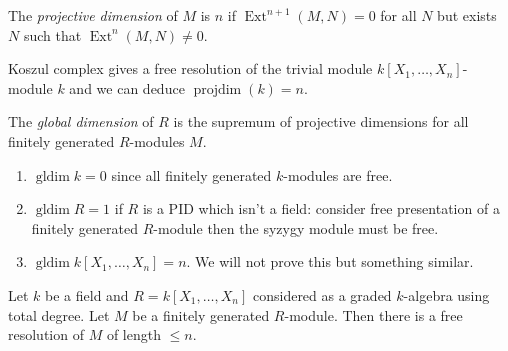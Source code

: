 \documentclass[a4paper]{article}
\DeclareMathOperator{\Ext}{Ext}
\DeclareMathOperator{\projdim}{projdim} %
\DeclareMathOperator{\gldim}{gldim} %
\begin{document}
\begin{definition}
  The \emph{projective dimension} of \(M\) is \(n\)  if \(\Ext^{n + 1}(M, N) = 0\) for all \(N\) but exists \(N\) such that \(\Ext^n(M, N) \ne 0\).
\end{definition}

\begin{eg}
  Koszul complex gives a free resolution of the trivial module \(k[X_1, \dots, X_n]\)-module \(k\) and we can deduce \(\projdim(k) = n\).
\end{eg}

\begin{definition}
  The \emph{global dimension} of \(R\) is the supremum of projective dimensions for all finitely generated \(R\)-modules \(M\).
\end{definition}

\begin{eg}\leavevmode
  \begin{enumerate}
  \item \(\gldim k = 0\) since all finitely generated \(k\)-modules are free.
  \item \(\gldim R = 1\) if \(R\) is a PID which isn't a field: consider free presentation of a finitely generated \(R\)-module then the syzygy module must be free.
  \item \(\gldim k[X_1, \dots, X_n] = n\). We will not prove this but something similar.
  \end{enumerate}
\end{eg}

\begin{theorem}
  Let \(k\) be a field and \(R = k[X_1, \dots, X_n]\) considered as a graded \(k\)-algebra using total degree. Let \(M\) be a finitely generated \(R\)-module. Then there is a free resolution of \(M\) of length \(\leq n\).
\end{theorem}
\end{document}
